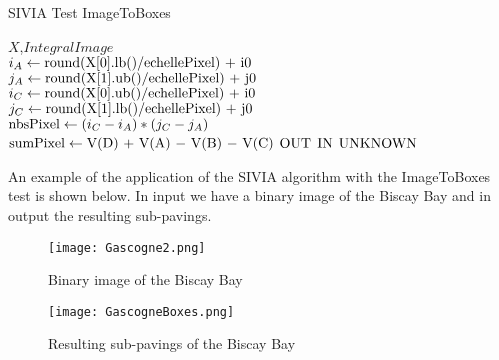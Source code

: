 \begin{algorithm}[H]
\caption{SIVIA Test ImageToBoxes}
\label{alg:one_boat_alg}
\begin{algorithmic}[1]
\REQUIRE $X$,$IntegralImage$\\
$i_A \leftarrow \textnormal{round(X[0].lb()/echellePixel) + i0}$\\
$j_A \leftarrow \textnormal{round(X[1].ub()/echellePixel) + j0}$\\
$i_C \leftarrow \textnormal{round(X[0].ub()/echellePixel) + i0}$\\
$j_C \leftarrow \textnormal{round(X[1].lb()/echellePixel) + j0}$\\
$ \textnormal{nbsPixel} \leftarrow (i_C - i_A) * (j_C - j_A)$\\
$ \textnormal{sumPixel} \leftarrow \textnormal{V(D) \ensuremath{+} V(A) \ensuremath{-} V(B) \ensuremath{-} V(C)}$
\RETURN $\textnormal{OUT}$
\RETURN $\textnormal{IN}$
\ELSE
\RETURN $\textnormal{UNKNOWN}$
\ENDIF
\end{algorithmic}
\end{algorithm}

\vspace{1cm}
An example of the application of the SIVIA algorithm with the ImageToBoxes test is shown below. In input we have a binary image of the Biscay Bay and in output the resulting sub-pavings.
\begin{figure}[H]
\centering
    \begin{minipage}[b]{0.4\textwidth}
    \texttt{[image: Gascogne2.png]}
	\caption{Binary image of the Biscay Bay } 
	\label{fig: Biscay Bay}
    \end{minipage}
    \begin{minipage}[b]{0.4\textwidth}
    \texttt{[image: GascogneBoxes.png]} 
	\caption{Resulting sub-pavings of the Biscay Bay } 
	\label{fig: Sub-pavings of the Biscay Bay}
    \end{minipage}
\end{figure}

